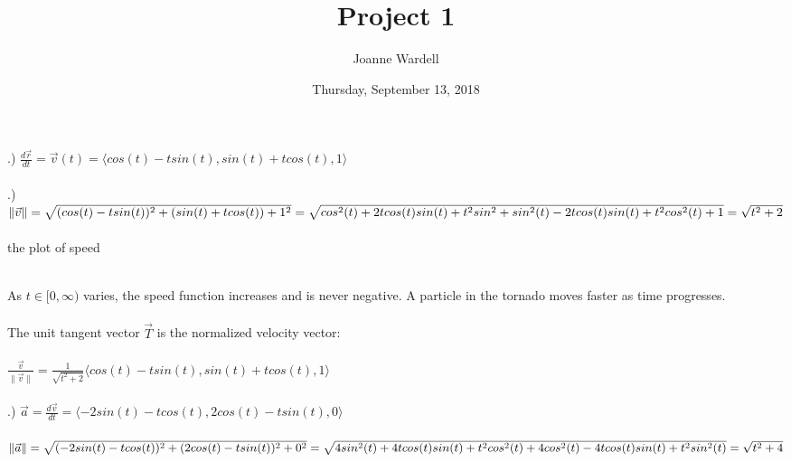 \documentclass[12pt]{article}
\title{\vspace{-2.0cm}Project 1}
\author{Joanne Wardell}
\date{Thursday, September 13, 2018}
\begin{document}
\maketitle
{}.) $\frac{d\vec{r}}{dt} = \vec{v}(t) = \langle cos(t) -tsin(t), sin(t) + tcos(t), 1\rangle$\\\\
.) $\| \vec{v}\|  = \sqrt{(cos(t) - tsin(t))^{2} + (sin(t) + tcos(t)) + 1^{2}}
\\\\= \sqrt{cos^{2}(t) + 2tcos(t)sin(t) + t^{2}sin^{2} + sin^{2}(t) -2tcos(t)sin(t) + t^{2}cos^{2}(t) + 1} 
\\\\ = \sqrt{t^{2} + 2}$\\\\
\noindent the plot of speed\\\\



\noindent As $t \in [0, \infty)$ varies, the speed function increases and is never negative.
A particle in the tornado moves faster as time progresses.\\\\
\noindent The unit tangent vector $\vec{T}$ is the normalized velocity vector:\\\\
$\frac{\vec{v}}{\| \vec{v} \|} = \frac{1}{\sqrt{t^{2}+ 2}}\langle cos(t) -tsin(t), sin(t) + tcos(t), 1\rangle$\\\\
.) $\vec{a} = \frac{d\vec{v}}{dt} = \langle - 2sin(t) -tcos(t), 2cos(t) - tsin(t), 0\rangle$\\\\
\noindent $\| \vec{a} \| = \sqrt{(-2sin(t)-tcos(t))^{2} + (2cos(t) - tsin(t))^{2} + 0^{2}} \\\\= 
\sqrt{4sin^{2}(t)+4tcos(t)sin(t)+t^{2}cos^{2}(t) + 4cos^{2}(t)-4tcos(t)sin(t)+t^{2}sin^{2}(t)} \\\\= \sqrt{t^{2} + 4}$\\\\
\end{document}
